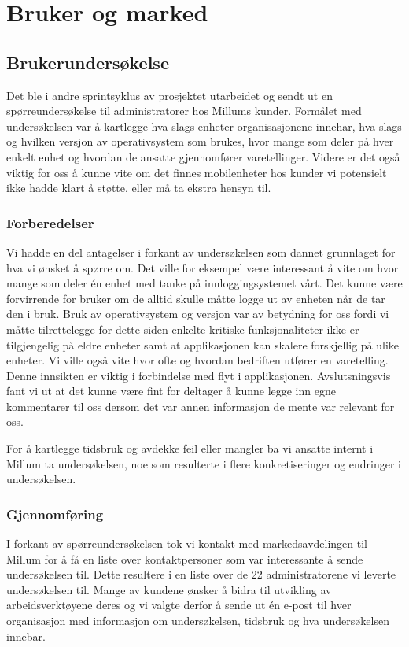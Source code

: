 \chapter{\color{Millum}\textbf{Bruker og marked}}
\section{\textbf{Brukerundersøkelse}}
Det ble i andre sprintsyklus av prosjektet utarbeidet og sendt ut en spørreundersøkelse til administratorer hos Millums kunder. Formålet med undersøkelsen var å kartlegge hva slags enheter organisasjonene innehar, hva slags og hvilken versjon av operativsystem som brukes, hvor mange som deler på hver enkelt enhet og hvordan de ansatte gjennomfører varetellinger. Videre er det også viktig for oss å kunne vite om det finnes mobilenheter hos kunder vi potensielt ikke hadde klart å støtte, eller må ta ekstra hensyn til. 

\subsection{\textbf{Forberedelser}}
Vi hadde en del antagelser i forkant av undersøkelsen som dannet grunnlaget for hva vi ønsket å spørre om. Det ville for eksempel være interessant å vite om hvor mange som deler én enhet med tanke på innloggingsystemet vårt. Det kunne være forvirrende for bruker om de alltid skulle måtte logge ut av enheten når de tar den i bruk. Bruk av operativsystem og versjon var av betydning for oss fordi vi måtte tilrettelegge for dette siden enkelte kritiske funksjonaliteter ikke er tilgjengelig på eldre enheter samt at applikasjonen kan skalere forskjellig på ulike enheter. Vi ville også vite hvor ofte og hvordan bedriften utfører en varetelling. Denne innsikten er viktig i forbindelse med flyt i applikasjonen. Avslutsningsvis fant vi ut at det kunne være fint for deltager å kunne legge inn egne kommentarer til oss dersom det var annen informasjon de mente var relevant for oss.

For å kartlegge tidsbruk og avdekke feil eller mangler ba vi ansatte internt i Millum ta undersøkelsen, noe som resulterte i flere konkretiseringer og endringer i undersøkelsen.

\subsection{\textbf{Gjennomføring}}
I forkant av spørreundersøkelsen tok vi kontakt med markedsavdelingen til Millum for å få en liste over kontaktpersoner som var interessante å sende undersøkelsen til. Dette resultere i en liste over de 22 administratorene vi leverte undersøkelsen til. Mange av kundene ønsker å bidra til utvikling av arbeidsverktøyene deres og vi valgte derfor å sende ut én e-post til hver organisasjon med informasjon om undersøkelsen, tidsbruk og hva undersøkelsen innebar.

